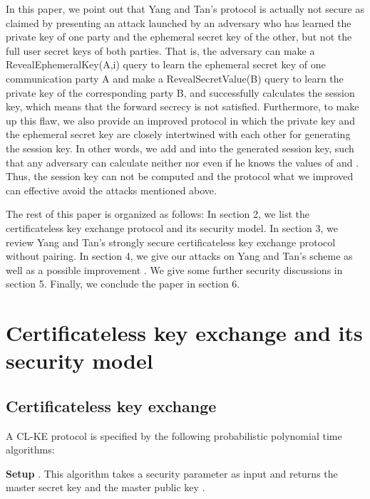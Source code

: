 \documentclass[final,1p,times,twocolumn]{elsarticle}
\begin{document}
\vspace{0.1cm}


In this paper, we point out that Yang and Tan's protocol is actually not secure as claimed by presenting an attack launched by an adversary who has learned the private key of one party and the ephemeral secret key of the other, but not the full user secret keys of both parties. That is, the adversary can make a RevealEphemeralKey(A,i) query to learn the ephemeral secret key  of one communication party A and make a RevealSecretValue(B) query to learn the private key  of the corresponding party B, and successfully calculates the session key, which means that the forward secrecy is not satisfied. Furthermore, to make up this flaw, we also provide an improved protocol in which the private key and the ephemeral secret key are closely  intertwined with each other for generating the session key. In other words, we add  and  into the generated session key, such that any adversary can calculate neither  nor   even if he knows the values of  and . Thus, the session key can not be computed and the protocol what we improved can effective avoid the attacks mentioned above.

\vspace{0.1cm}

The rest of this paper is organized as follows: In section 2, we list the certificateless key exchange protocol and its security model. In section 3, we review Yang and Tan's strongly secure certificateless key exchange protocol without pairing. In section 4, we give our attacks on Yang and Tan's scheme as well as a possible improvement . We give some further security discussions in section 5.  Finally, we conclude the paper in section 6.


\section{Certificateless key exchange and its security model}
\label{2}

\subsection{Certificateless  key  exchange}
\label{2.1}

A CL-KE protocol is specified by the following probabilistic polynomial time algorithms:
\vspace{0.2cm}

{\bf Setup }. This algorithm takes a security parameter  as input and returns the master secret key  and the master public key .
\end{document}

